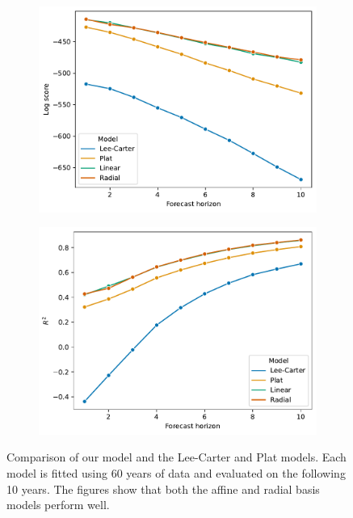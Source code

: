 \documentclass[11pt]{article}
\begin{document}
\begin{figure}
    \centering
    \begin{subfigure}[t]{0.49\textwidth}
        \centering
        \includegraphics[width=\textwidth]{figs/model_comparison_log_score.pdf}
        \caption{}
    \end{subfigure}
    \hfill
    \begin{subfigure}[t]{0.49\textwidth}
        \centering
        \includegraphics[width=\textwidth]{figs/model_comparison_R2.pdf}
        \caption{}
    \end{subfigure}
    \hfill
        \caption{Comparison of our model and the Lee-Carter and Plat models. Each model is fitted using 60 years of data and evaluated on the following 10 years. The figures show that both the affine and radial basis models perform well.}
        \label{fig:model_comparison}
\end{figure}
\end{document}
